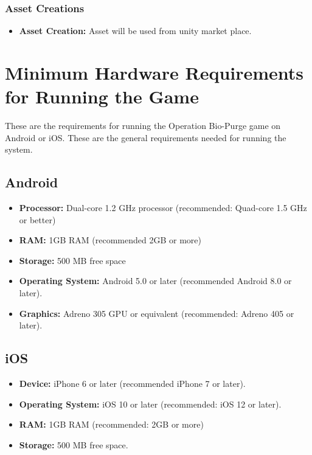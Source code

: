 \subsubsection{Asset Creations}
\begin{itemize}
	\item \textbf{Asset Creation:} Asset will be used from unity market place.
\end{itemize}

\section{Minimum Hardware Requirements for Running the Game}
These are the requirements for running the Operation Bio-Purge game on Android or iOS. These are the general requirements needed for running the system.
\subsection{Android}
\begin{itemize}
	\item \textbf{Processor:} Dual-core 1.2 GHz processor (recommended: Quad-core 1.5 GHz or better)
	\item \textbf{RAM:} 1GB RAM (recommended 2GB or more)
	\item \textbf{Storage:} 500 MB free space 
	\item \textbf{Operating System:} Android 5.0 or later (recommended Android 8.0 or later).
	\item \textbf{Graphics:} Adreno 305 GPU or equivalent (recommended: Adreno 405 or later).
\end{itemize}
\subsection{iOS}
\begin{itemize}
	\item \textbf{Device:}	 iPhone 6 or later (recommended iPhone 7 or later).
	\item \textbf{Operating System:}  iOS 10 or later (recommended: iOS 12 or later).
	\item \textbf{RAM:} 1GB RAM (recommended: 2GB or more)
	\item \textbf{Storage:} 500 MB free space.	
\end{itemize}